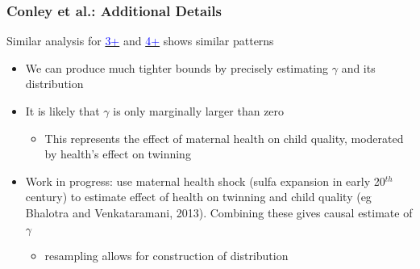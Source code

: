 \documentclass[10pt,letterpaper,subeqn]{beamer}
\begin{document}

\begin{frame}[label=Conley]
\frametitle{Conley et al.: Additional Details}
Similar analysis for \hyperlink{three}{\textcolor{blue}{3+}} and \hyperlink{four}{\textcolor{blue}{4+}} shows similar patterns
\vspace{5mm}
\begin{itemize}
\item We can produce much tighter bounds by precisely estimating $\gamma$ and its distribution
\item It is likely that $\gamma$ is only marginally larger than zero
\begin{itemize}
\item This represents the effect of maternal health on child quality, moderated by health's effect on twinning
\end{itemize}
\item Work in progress: use maternal health shock (sulfa expansion in early 20$^{th}$ century) to estimate
effect of health on twinning and child quality (eg Bhalotra and Venkataramani, 2013).  Combining these gives causal estimate of $\gamma$
\begin{itemize}
\item resampling allows for construction of distribution
\end{itemize}
\end{itemize}
\end{frame}
\end{document}
